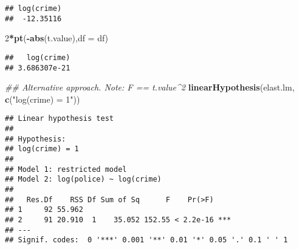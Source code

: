 \documentclass[
]{article}
\newenvironment{Shaded}{\begin{snugshade}}{\end{snugshade}}
\newcommand{\CommentTok}[1]{\textcolor[rgb]{0.56,0.35,0.01}{\textit{#1}}}
\newcommand{\DataTypeTok}[1]{\textcolor[rgb]{0.13,0.29,0.53}{#1}}
\newcommand{\DecValTok}[1]{\textcolor[rgb]{0.00,0.00,0.81}{#1}}
\newcommand{\KeywordTok}[1]{\textcolor[rgb]{0.13,0.29,0.53}{\textbf{#1}}}
\newcommand{\NormalTok}[1]{#1}
\newcommand{\OperatorTok}[1]{\textcolor[rgb]{0.81,0.36,0.00}{\textbf{#1}}}
\newcommand{\StringTok}[1]{\textcolor[rgb]{0.31,0.60,0.02}{#1}}
\begin{document}
\begin{Shaded}
\end{Shaded}

\begin{verbatim}
## log(crime) 
##  -12.35116
\end{verbatim}

\begin{Shaded}
\begin{Highlighting}[]
\DecValTok{2}\OperatorTok{*}\KeywordTok{pt}\NormalTok{(}\OperatorTok{-}\KeywordTok{abs}\NormalTok{(t.value),}\DataTypeTok{df =}\NormalTok{ df)}
\end{Highlighting}
\end{Shaded}

\begin{verbatim}
##   log(crime) 
## 3.686307e-21
\end{verbatim}

\begin{Shaded}
\begin{Highlighting}[]
\CommentTok{## Alternative approach. Note: F == t.value^2}
\KeywordTok{linearHypothesis}\NormalTok{(elast.lm, }\KeywordTok{c}\NormalTok{(}\StringTok{"log(crime) = 1"}\NormalTok{))}
\end{Highlighting}
\end{Shaded}

\begin{verbatim}
## Linear hypothesis test
## 
## Hypothesis:
## log(crime) = 1
## 
## Model 1: restricted model
## Model 2: log(police) ~ log(crime)
## 
##   Res.Df    RSS Df Sum of Sq      F    Pr(>F)    
## 1     92 55.962                                  
## 2     91 20.910  1    35.052 152.55 < 2.2e-16 ***
## ---
## Signif. codes:  0 '***' 0.001 '**' 0.01 '*' 0.05 '.' 0.1 ' ' 1
\end{verbatim}
\end{document}

